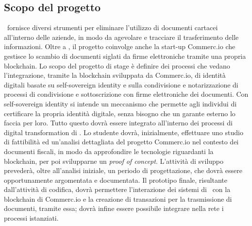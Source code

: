 
\subsection{Scopo del progetto}
	\ragioneSocAzienda\ fornisce diversi strumenti per eliminare l'utilizzo di documenti cartacei all’interno delle aziende, in modo da agevolare e tracciare il trasferimento delle informazioni. Oltre a \ragioneSocAzienda, il progetto coinvolge anche la start-up Commerc.io che gestisce lo scambio di documenti siglati da firme elettroniche tramite una propria blockchain.
	\newline
	Lo scopo del progetto di stage è definire dei processi che vedano l'integrazione, tramite la blockchain sviluppata da Commerc.io, di identità digitali basate su self-sovereign identity e sulla condivisione e notarizzazione di processi di condivisione e sottoscrizione con firme elettroniche dei documenti.
	\newline
	Con self-sovereign identity si intende un meccanismo che permette agli individui di certificare la propria identità digitale, senza bisogno che un garante esterno lo faccia per loro.
	\newline
	Tutto questo dovrà essere integrato all'interno dei processi di digital transformation di \ragioneSocAzienda.
	\newline
	Lo studente dovrà, inizialmente, effettuare uno studio di fattibilità ed un'analisi dettagliata del progetto Commerc.io nel contesto dei documenti fiscali, in modo da approfondire le tecnologie riguardanti la blockchain, per poi svilupparne un \textit{proof of concept}.
	\newline
	L'attività di sviluppo prevederà, oltre all'analisi iniziale, un periodo di progettazione, che dovrà essere opportunamente argomentata e documentata. Il prototipo finale, risultante dall'attività di codifica, dovrà permettere l'interazione dei sistemi di \ragioneSocAzienda\ con la blockchain di Commerc.io e la creazione di transazioni per la trasmissione di documenti, tramite essa; dovrà infine essere possibile integrare nella rete i processi istanziati.